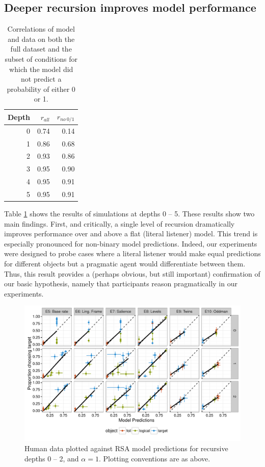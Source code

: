 \documentclass[man,noapacite]{apa2}
\begin{document}
\subsection{Deeper recursion improves model performance}

\begin{table}[ht]
\centering
\begin{tabular}{rrr}
  \hline
Depth & $r_{all}$ & $r_{no~0/1}$ \\
  \hline
  0 & 0.74 & 0.14 \\
    1 & 0.86 & 0.68 \\
    2 & 0.93 & 0.86 \\
    3 & 0.95 & 0.90 \\
    4 & 0.95 & 0.91 \\
    5 & 0.95 & 0.91 \\
   \hline
\end{tabular}
\caption{\label{tab:corr-a1} Correlations of model and data on both the full dataset and the subset of conditions for which the model did not predict a probability of either 0 or 1.}
\end{table}

Table \ref{tab:corr-a1} shows the results of simulations at depths 0 -- 5. These results show two main findings. First, and critically, a single level of recursion dramatically improves performance over and above a flat (literal listener) model. This trend is especially pronounced for non-binary model predictions. Indeed, our experiments were designed to probe cases where a literal listener would make equal predictions for different objects but a pragmatic agent would differentiate between them. Thus, this result provides a (perhaps obvious, but still important) confirmation of our basic hypothesis, namely that participants reason pragmatically in our experiments.

\begin{figure}[t]
 \centering
 \includegraphics[width=6in]{../plots/model_depth.pdf}
 \caption{\label{fig:depths} Human data plotted against RSA model predictions for recursive depths 0 -- 2, and $\alpha=1$. Plotting conventions are as above.}
\end{figure}
\end{document}
